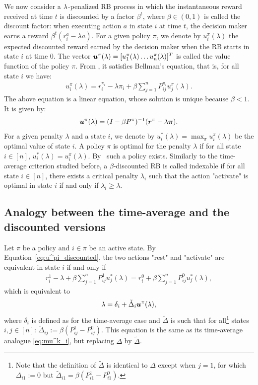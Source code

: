 \documentclass[acmsmall,screen,anonymous]{acmart}
\begin{document}
We now consider a $\lambda$-penalized RB process in which the instantaneous reward received at time $t$ is discounted by a factor $\beta^t$, where $\beta\in(0,1)$ is called the discount factor: when executing action $a$ in state $i$ at time $t$, the decision maker earns a reward $\beta^t (r^a_i - \lambda a)$. For a given policy $\pi$, we denote by $u^\pi_i(\lambda)$ the expected discounted reward earned by the decision maker when the RB starts in state $i$ at time $0$. The vector $\boldsymbol{u}^\pi(\lambda)=[u^\pi_1(\lambda)\dots u^\pi_n(\lambda)]^T$ is called the value function of the policy $\pi$. From \cite{putermanMarkovDecisionProcesses1994}, it satisfies Bellman's equation, that is, for all state $i$ we have: 
\begin{align}
    \label{eq:u^pi_discounted}
    u^\pi_i(\lambda) = r_i^{\pi_i} - \lambda \pi_i + \beta \sum_{j=1}^n P^{\pi_i}_{ij} u^\pi_j(\lambda).
\end{align}
The above equation is a linear equation, whose solution is unique because $\beta<1$. It is given by:
\begin{align}
    \label{eq:h is linear discounted}
    \boldsymbol{u}^\pi(\lambda) = (I - \beta P^\pi)^{-1}(\boldsymbol{r}^{\pi} - \lambda \boldsymbol{\pi}).
\end{align}
For a given penalty $\lambda$ and a state $i$, we denote by $u^*_i(\lambda)=\max_\pi u^\pi_i(\lambda)$ be the optimal value of state $i$.  A policy $\pi$ is optimal for the penalty $\lambda$ if for all state $i\in[n]$, $u^*_i(\lambda)=u^\pi_i(\lambda)$. By~\cite{putermanMarkovDecisionProcesses1994} such a policy exists.  Similarly to the time-average criterion studied before, a $\beta$-discounted RB is called indexable if for all state $i\in[n]$, there exists a critical penalty $\lambda_i$ such that the action "activate" is optimal in state $i$ if and only if $\lambda_i\ge\lambda$. 

\subsection{Analogy between the time-average and the discounted versions}

Let $\pi$ be a policy and $i\in\pi$ be an active state. By Equation~\eqref{eq:u^pi_discounted}, the two actions "rest" and "activate" are equivalent in state $i$ if and only if 
\begin{align*}
    r^1_i - \lambda + \beta \sum_{j=1}^n P^{1}_{ij} u^*_j(\lambda) = r^0_i + \beta \sum_{j=1}^n P^{0}_{ij} u^*_j(\lambda),
\end{align*}
which is equivalent to
\begin{align}
    \label{eq:mu^k_i discounted}
    \lambda = \delta_i + \tilde{\Delta}_i \boldsymbol{u}^\pi(\lambda),
\end{align}
where $\delta_i$ is defined as for the time-average case and $\tilde{\Delta}$ is such that for all\footnote{Note that the definition of $\tilde{\Delta}$ is identical to $\Delta$ except when $j=1$, for which $\Delta_{i1}:=0$ but $\tilde{\Delta}_{i1}=\beta(P^1_{i1}-P^0_{i1})$.} states $i,j\in[n]$: $\tilde{\Delta}_{ij}:=\beta(P^1_{ij}-P^0_{ij})$.   This equation is the same as its time-average analogue \eqref{eq:mu^k_i}, but replacing $\Delta$ by $\tilde{\Delta}$.
\end{document}
